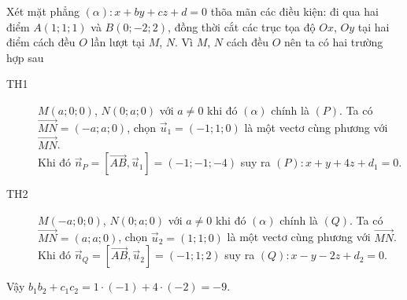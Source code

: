 \begin{ex}
{		Xét mặt phẳng $\left(\alpha\right) \colon x+by+cz+d=0$ thõa mãn các điều kiện: đi qua hai điểm $A \left(1;1;1\right)$ và $B\left(0;-2;2\right)$, đồng thời cắt các trục tọa độ $Ox$, $Oy$ tại hai điểm cách đều $O$ lần lượt tại $M$, $N$. Vì $M$, $N$ cách đều $O$ nên ta có hai trường hợp sau
		\begin{description}
			\item[TH1] $M \left(a;0;0\right)$, $N \left(0;a;0\right)$ với $a \neq 0$ khi đó $\left(\alpha\right)$ chính là $\left(P\right)$. Ta có $\overrightarrow{MN} = \left(-a;a;0\right)$, chọn $\overrightarrow{u}_1 = \left(-1;1;0\right)$ là một vectơ cùng phương với $\overrightarrow{MN}$.\\
			Khi đó $\overrightarrow{n}_P = \left[\overrightarrow{AB},\overrightarrow{u}_1\right] = \left(-1;-1;-4\right)$
			suy ra $\left(P\right) \colon x+y+4z+d_1 = 0$.
			\item[TH2] $M \left(-a;0;0\right)$, $N \left(0;a;0\right)$ với $a \neq 0$ khi đó $\left(\alpha\right)$ chính là $\left(Q\right)$. Ta có $\overrightarrow{MN} = \left(a;a;0\right)$, chọn $\overrightarrow{u}_2 = \left(1;1;0\right)$ là một vectơ cùng phương với $\overrightarrow{MN}$.\\
			Khi đó $\overrightarrow{n}_Q = \left[\overrightarrow{AB},\overrightarrow{u}_2\right] = \left(-1;1;2\right)$
			suy ra $\left(Q\right) \colon x-y-2z+d_2 = 0$.
		\end{description}
		Vậy $b_1b_2 + c_1c_2 = 1 \cdot \left(-1\right) + 4 \cdot \left(-2\right) = -9$.
	}
\end{ex}
